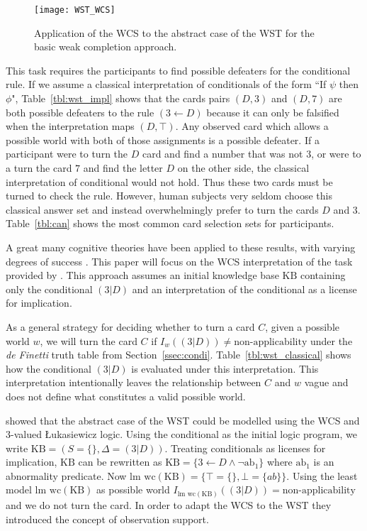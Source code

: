 \begin{figure}
\centering \texttt{[image: WST\_WCS]}
\caption{Application of the WCS to the abstract case of the WST for the basic weak completion approach.}
\label{wst_wcs}
\end{figure}

This task requires the participants to find possible defeaters for the conditional rule. If we assume a classical interpretation of conditionals of the form ``If $\psi$ then $\phi$", Table~\ref{tbl:wst_impl} shows that the cards pairs $(D,3)$ and $(D,7)$ are both possible defeaters to the rule $(3 \leftarrow D)$ because it can only be falsified when the interpretation maps $(D,\top)$. Any observed card which allows a possible world with both of those assignments is a possible defeater. If a participant were to turn the $D$ card and find a number that was not $3$, or were to a turn the card $7$ and find the letter $D$ on the other side, the classical interpretation of conditional would not hold. Thus these two cards must be turned to check the rule. However, human subjects very seldom choose this classical answer set and instead overwhelmingly prefer to turn the cards $D$ and $3$. Table~\ref{tbl:can} shows the most common card selection sets for participants.

A great many cognitive theories have been applied to these results, with varying degrees of success \citep{ragni2017formal}. This paper will focus on the WCS interpretation of the task provided by \cite{ragni2017wason}. This approach assumes an initial knowledge base $\text{KB}$ containing only the conditional $(3|D)$ and an interpretation of the conditional as a license for implication.

As a general strategy for deciding whether to turn a card $C$, given a possible world $w$, we will turn the card $C$ if $I_w((3|D))\neq \text{non-applicability}$ under the \textit{de Finetti} truth table from Section~\ref{ssec:condi}. Table~\ref{tbl:wst_classical} shows how the conditional $(3|D)$ is evaluated under this interpretation. This interpretation intentionally leaves the relationship between $C$ and $w$ vague and does not define what constitutes a valid possible world.

\cite{dietz2012computational} showed that the abstract case of the WST could be modelled using the WCS and 3-valued \L ukasiewicz logic. Using the conditional as the initial logic program, we write $\text{KB}=(S=\{\},\Delta=(3|D))$. Treating conditionals as licenses for implication, $\text{KB}$ can be rewritten as $\text{KB}=\{3\leftarrow D \land \lnot \text{ab}_1\}$ where $\text{ab}_1$ is an abnormality predicate. Now $\textrm{lm wc}(\text{KB})=\{\top=\{\},\bot=\{ab\}\}$. Using the least model $\textrm{lm wc}(\text{KB})$ as possible world $I_{\textrm{lm wc}(\text{KB})}((3|D))=\text{non-applicability}$ and we do not turn the card. In order to adapt the WCS to the WST they introduced the concept of observation support.

